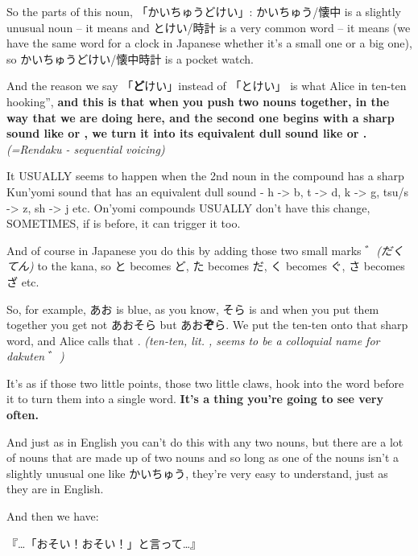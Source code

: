 \thinrule

So the parts of this noun, 「かいちゅうどけい」: かいちゅう/懐中 is a slightly unusual noun -- it means  and とけい/時計 is a very common word -- it means  (we have the same word for a clock in Japanese whether it's a small one or a big one), so かいちゅうどけい/懐中時計 is a pocket watch.

And the reason we say 「{\bf ど}けい」instead of 「とけい」 is what Alice in ten-ten hooking”, {\bf and this is that when you push two nouns together, in the way that we are doing here, and the second one begins with a sharp sound like  or , we turn it into its equivalent dull sound like  or .} {\em (=Rendaku - sequential voicing)}

{}

It USUALLY seems to happen when the 2nd noun in the compound has a sharp Kun'yomi sound that has an equivalent dull sound - h -> b, t -> d, k -> g, tsu/s -> z, sh -> j etc. On'yomi compounds USUALLY don't have this change, SOMETIMES, if  is before, it can trigger it too.

And of course in Japanese you do this by adding those two small marks ゛{\em (だくてん)} to the kana, so と becomes ど, た becomes だ, く becomes ぐ, さ becomes ざ etc.

So, for example, あお is blue, as you know, そら is  and when you put them together you get not あおそら but あお{\bf ぞ}ら. We put the ten-ten onto that sharp word, and Alice calls that . {\em (ten-ten, lit. , seems to be a colloquial name for dakuten} ゛{\em )}

It's as if those two little points, those two little claws, hook into the word before it to turn them into a single word. {\bf It's a thing you're going to see very often.}

And just as in English you can't do this with any two nouns, but there are a lot of nouns that are made up of two nouns and so long as one of the nouns isn't a slightly unusual one like かいちゅう, they're very easy to understand, just as they are in English.

And then we have:

『\ldots{}「おそい！おそい！」と言って\ldots{}』

\startsectionlevel[title={The と quotation particle},reference={the-と-quotation-particle}]

